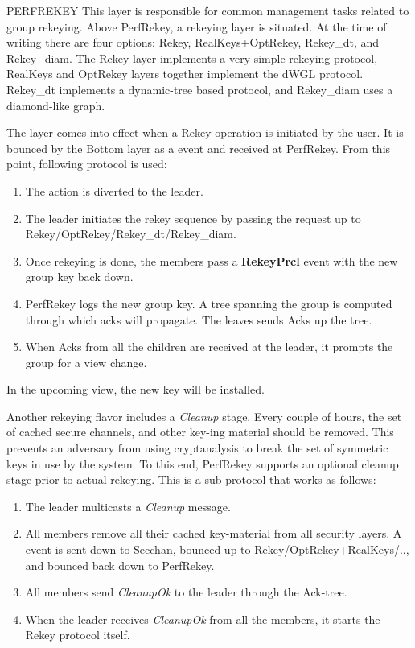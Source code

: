%
%
%
\begin{Layer}{PERFREKEY}
\label{layer:perfrekey}
This layer is responsible for common management tasks related to group
rekeying. Above PerfRekey, a rekeying layer is situated. At the time
of writing there are four options: Rekey, RealKeys+OptRekey, Rekey\_dt,
and Rekey\_diam. The Rekey layer implements a very simple rekeying
protocol, RealKeys and OptRekey layers together implement the dWGL
protocol. Rekey\_dt implements a dynamic-tree based protocol, and
Rekey\_diam uses a diamond-like graph. 

\begin{Protocol}
The layer comes into effect when a Rekey operation is
initiated by the user. It is bounced by the Bottom layer as a 
event and received at PerfRekey. From this point, following protocol is used: 

\begin{enumerate}
\item The  action is diverted to the leader.
\item The leader initiates the rekey sequence by 
 passing the request up to Rekey/OptRekey/Rekey\_dt/Rekey\_diam.
\item Once rekeying is done, the members pass a {\bf RekeyPrcl} event with 
    the new group key back down. 
\item PerfRekey logs the new group key. A tree spanning the group 
    is computed through which acks will propagate. The leaves 
    sends Acks up the tree.
\item When Acks from all the children are received at the leader,
    it prompts the group for a view change. 
\end{enumerate}

In the upcoming view, the new key will be installed. 

Another rekeying flavor includes a {\it Cleanup} stage. Every couple
of hours, the set of cached secure channels, and other key-ing
material should be removed. This prevents an adversary from using
cryptanalysis to break the set of symmetric keys in use by the
system. To this end, PerfRekey supports an optional cleanup stage
prior to actual rekeying.  This is a sub-protocol that works as follows:
\begin{enumerate}
\item The leader multicasts a {\it Cleanup} message.
\item All members remove all their cached key-material from all
security layers. A  event is sent down to
Secchan, bounced up to Rekey/OptRekey+RealKeys/.., and bounced back down
to PerfRekey.
\item All members send {\it CleanupOk} to the leader through the Ack-tree.
\item When the leader receives {\it CleanupOk} from all the members, it starts
the Rekey protocol itself.
\end{enumerate}


\end{Protocol}
\end{Layer}
